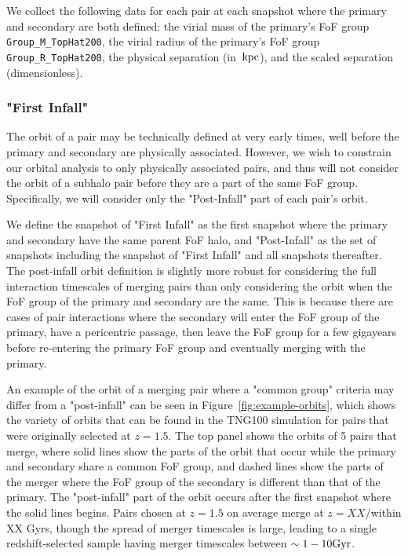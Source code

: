 \documentclass[twocolumn]{aastex631}
\begin{document}
We collect the following data for each pair at each snapshot where the primary and secondary are both defined: the virial mass of the primary's FoF group \texttt{Group\_M\_TopHat200}, the virial radius of the primary's FoF group \texttt{Group\_R\_TopHat200}, the physical separation (in $\mathrm{\,kpc}$), and the scaled separation (dimensionless).

\subsubsection{"First Infall"}
The orbit of a pair may be technically defined at very early times, well before the primary and secondary are physically associated. 
However, we wish to constrain our orbital analysis to only physically associated pairs, and thus will not consider the orbit of a subhalo pair before they are a part of the same FoF group. Specifically, we will consider only the "Post-Infall" part of each pair's orbit. 

We define the snapshot of "First Infall" as the first snapshot where the primary and secondary have the same parent FoF halo, and "Post-Infall" as the set of snapshots including the snapshot of "First Infall" and all snapshots thereafter. 
The post-infall orbit definition is slightly more robust for considering the full interaction timescales of merging pairs than only considering the orbit when the FoF group of the primary and secondary are the same. 
This is because there are cases of pair interactions where the secondary will enter the FoF group of the primary, have a pericentric passage, then leave the FoF group for a few gigayears before re-entering the primary FoF group and eventually merging with the primary. 

An example of the orbit of a merging pair where a "common group" criteria may differ from a "post-infall" can be seen in Figure~\ref{fig:example-orbits}, which shows the variety of orbits that can be found in the TNG100 simulation for pairs that were originally selected at $z=1.5$. 
The top panel shows the orbits of 5 pairs that merge, where solid lines show the parts of the orbit that occur while the primary and secondary share a common FoF group, and dashed lines show the parts of the merger where the FoF group of the secondary is different than that of the primary. 
The "post-infall" part of the orbit occurs after the first snapshot where the solid lines begins.
Pairs chosen at $z=1.5$ on average merge at $z=XX$/within XX Gyrs, though the spread of merger timescales is large, leading to a single redshift-selected sample having merger timescales between $\sim1-10\mathrm{Gyr}$.
\end{document}
